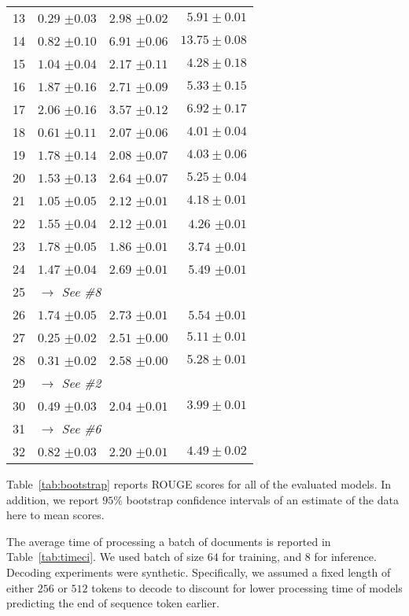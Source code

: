 \documentclass{article}
\begin{document}
\begin{table}
\begin{tabular}{rrrr}
    13 & $0.29$ $\pm 0.03$ & $2.98$ $\pm 0.02$ & $5.91 \pm 0.01$ \\
    14 & $0.82$ $\pm 0.10$ & $6.91$ $\pm 0.06$ & $13.75 \pm 0.08$ \\
    15 & $1.04$ $\pm 0.04$ & $2.17$ $\pm 0.11$ & $4.28 \pm 0.18$ \\
    16 & $1.87$ $\pm 0.16$ & $2.71$ $\pm 0.09$ & $5.33 \pm 0.15$ \\
    17 & $2.06$ $\pm 0.16$ & $3.57$ $\pm 0.12$ & $6.92 \pm 0.17$ \\
    18 & $0.61$ $\pm 0.11$ & $2.07$ $\pm 0.06$ & $4.01 \pm 0.04$ \\
    19 & $1.78$ $\pm 0.14$ & $2.08$ $\pm 0.07$ & $4.03 \pm 0.06$ \\
    20 & $1.53$ $\pm 0.13$ & $2.64$ $\pm 0.07$ & $5.25 \pm 0.04$ \\
    21 & $1.05$ $\pm 0.05$ & $2.12$ $\pm 0.01$ & $4.18 \pm 0.01$ \\
    22 & $1.55$ $\pm 0.04$ & $2.12$ $\pm 0.01$ & $4.26$ $\pm 0.01$  \\ 23 & $1.78$ $\pm 0.05$ & $1.86$ $\pm 0.01$ & $3.74$ $\pm 0.01$  \\ 24 & $1.47$ $\pm 0.04$ & $2.69$ $\pm 0.01$ & $5.49$ $\pm 0.01$  \\ 25 & \multicolumn{3}{l}{\textit{$\rightarrow$ See \#8}} \\
    26 & $1.74$ $\pm 0.05$ & $2.73$ $\pm 0.01$ & $5.54$ $\pm 0.01$  \\ 

    27 & $0.25$ $\pm 0.02$ & $2.51$ $\pm 0.00$ & $5.11 \pm 0.01$ \\ 28 & $0.31$ $\pm 0.02$ & $2.58$ $\pm 0.00$ & $5.28 \pm 0.01$ \\ 29 & \multicolumn{3}{l}{\textit{$\rightarrow$ See \#2}} \\
    30 & $0.49$ $\pm 0.03$ & $2.04$ $\pm 0.01$ & $3.99 \pm 0.01$ \\ 31 & \multicolumn{3}{l}{\textit{$\rightarrow$ See  \#6}} \\
    32 & $0.82$ $\pm 0.03$ & $2.20$ $\pm 0.01$ & $4.49 \pm 0.02$ \\ 

    \bottomrule
    \end{tabular}
\end{table}


Table~\ref{tab:bootstrap} reports ROUGE scores for all of the evaluated models. In addition, we report $95\%$ bootstrap confidence intervals of an estimate of the data here to mean scores.

The average time of processing a batch of documents is reported in Table~\ref{tab:timeci}. We used batch of size $64$ for training, and $8$ for inference. Decoding experiments were synthetic. Specifically, we assumed a fixed length of either $256$ or $512$ tokens to decode to discount for lower processing time of models predicting the end of sequence token earlier.
\end{document}
